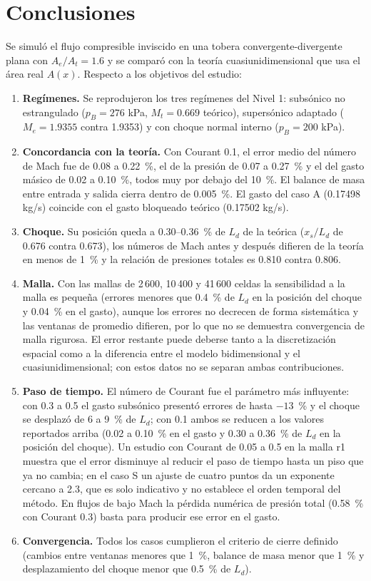 \documentclass[12pt,letterpaper]{article}
\numberwithin{equation}{section}
\begin{document}
\newpage
\section{Conclusiones}

Se simuló el flujo compresible inviscido en una tobera convergente-divergente plana con $A_e/A_t=1.6$ y se comparó con la teoría cuasiunidimensional que usa el área real $A(x)$. Respecto a los objetivos del estudio:

\begin{enumerate}
  \item \textbf{Regímenes.} Se reprodujeron los tres regímenes del Nivel 1: subsónico no estrangulado ($p_B=276$ kPa, $M_t=0.669$ teórico), supersónico adaptado ($M_e=1.9355$ contra 1.9353) y con choque normal interno ($p_B=200$ kPa).
  \item \textbf{Concordancia con la teoría.} Con Courant 0.1, el error medio del número de Mach fue de 0.08 a 0.22~\%, el de la presión de 0.07 a 0.27~\% y el del gasto másico de 0.02 a 0.10~\%, todos muy por debajo del 10~\%. El balance de masa entre entrada y salida cierra dentro de 0.005~\%. El gasto del caso A (0.17498 kg/s) coincide con el gasto bloqueado teórico (0.17502 kg/s).
  \item \textbf{Choque.} Su posición queda a 0.30--0.36~\% de $L_d$ de la teórica ($x_s/L_d$ de 0.676 contra 0.673), los números de Mach antes y después difieren de la teoría en menos de 1~\% y la relación de presiones totales es 0.810 contra 0.806.
  \item \textbf{Malla.} Con las mallas de 2\,600, 10\,400 y 41\,600 celdas la sensibilidad a la malla es pequeña (errores menores que 0.4~\% de $L_d$ en la posición del choque y 0.04~\% en el gasto), aunque los errores no decrecen de forma sistemática y las ventanas de promedio difieren, por lo que no se demuestra convergencia de malla rigurosa. El error restante puede deberse tanto a la discretización espacial como a la diferencia entre el modelo bidimensional y el cuasiunidimensional; con estos datos no se separan ambas contribuciones.
  \item \textbf{Paso de tiempo.} El número de Courant fue el parámetro más influyente: con 0.3 a 0.5 el gasto subsónico presentó errores de hasta $-13$~\% y el choque se desplazó de 6 a 9~\% de $L_d$; con 0.1 ambos se reducen a los valores reportados arriba (0.02 a 0.10~\% en el gasto y 0.30 a 0.36~\% de $L_d$ en la posición del choque). Un estudio con Courant de 0.05 a 0.5 en la malla r1 muestra que el error disminuye al reducir el paso de tiempo hasta un piso que ya no cambia; en el caso S un ajuste de cuatro puntos da un exponente cercano a 2.3, que es solo indicativo y no establece el orden temporal del método. En flujos de bajo Mach la pérdida numérica de presión total (0.58~\% con Courant 0.3) basta para producir ese error en el gasto.
  \item \textbf{Convergencia.} Todos los casos cumplieron el criterio de cierre definido (cambios entre ventanas menores que 1~\%, balance de masa menor que 1~\% y desplazamiento del choque menor que 0.5~\% de $L_d$).
\end{enumerate}
\end{document}
